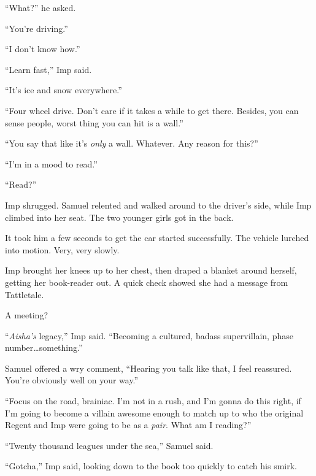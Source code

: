 ``What?'' he asked.



``You're driving.''



``I don't know how.''



``Learn fast,'' Imp said.



``It's ice and snow everywhere.''



``Four wheel drive.  Don't care if it takes a while to get there.  Besides, you can sense people, worst thing you can hit is a wall.''



``You say that like it's \emph{only} a wall.  Whatever.  Any reason for this?''



``I'm in a mood to read.''



``Read?''



Imp shrugged.  Samuel relented and walked around to the driver's side, while Imp climbed into her seat.  The two younger girls got in the back.



It took him a few seconds to get the car started successfully.  The vehicle lurched into motion.  Very, very slowly.



Imp brought her knees up to her chest, then draped a blanket around herself, getting her book-reader out.  A quick check showed she had a message from Tattletale.



A meeting?



``\emph{Aisha's} legacy,'' Imp said.  ``Becoming a cultured, badass supervillain, phase number\ldots something.''



Samuel offered a wry comment, ``Hearing you talk like that, I feel reassured.  You're obviously well on your way.''



``Focus on the road, brainiac.  I'm not in a rush, and I'm gonna do this right, if I'm going to become a villain awesome enough to match up to who the original Regent and Imp were going to be as a \emph{pair}.  What am I reading?''



``Twenty thousand leagues under the sea,'' Samuel said.



``Gotcha,'' Imp said, looking down to the book too quickly to catch his smirk.






